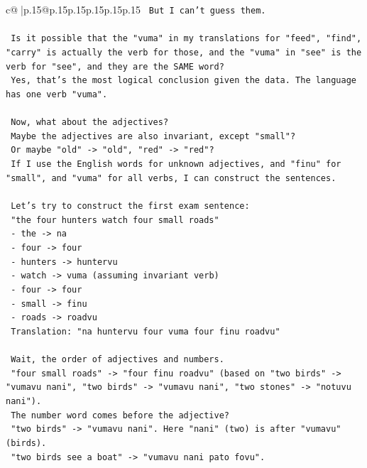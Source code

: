 \documentclass{article}
\begin{document}
{\begin{supertabular}{c@{$\;$}|p{.15\linewidth}@{}p{.15\linewidth}p{.15\linewidth}p{.15\linewidth}p{.15\linewidth}p{.15\linewidth}}
{{{\texttt{    But I can't guess them.} \\
\\ 
\texttt{    Is it possible that the "vuma" in my translations for "feed", "find", "carry" is actually the verb for those, and the "vuma" in "see" is the verb for "see", and they are the SAME word?} \\
\texttt{    Yes, that's the most logical conclusion given the data. The language has one verb "vuma".} \\
\\ 
\texttt{    Now, what about the adjectives?} \\
\texttt{    Maybe the adjectives are also invariant, except "small"?} \\
\texttt{    Or maybe "old" {-}> "old", "red" {-}> "red"?} \\
\texttt{    If I use the English words for unknown adjectives, and "finu" for "small", and "vuma" for all verbs, I can construct the sentences.} \\
\\ 
\texttt{    Let's try to construct the first exam sentence:} \\
\texttt{    "the four hunters watch four small roads"} \\
\texttt{    {-} the {-}> na} \\
\texttt{    {-} four {-}> four} \\
\texttt{    {-} hunters {-}> huntervu} \\
\texttt{    {-} watch {-}> vuma (assuming invariant verb)} \\
\texttt{    {-} four {-}> four} \\
\texttt{    {-} small {-}> finu} \\
\texttt{    {-} roads {-}> roadvu} \\
\texttt{    Translation: "na huntervu four vuma four finu roadvu"} \\
\\ 
\texttt{    Wait, the order of adjectives and numbers.} \\
\texttt{    "four small roads" {-}> "four finu roadvu" (based on "two birds" {-}> "vumavu nani", "two birds" {-}> "vumavu nani", "two stones" {-}> "notuvu nani").} \\
\texttt{    The number word comes before the adjective?} \\
\texttt{    "two birds" {-}> "vumavu nani". Here "nani" (two) is after "vumavu" (birds).} \\
\texttt{    "two birds see a boat" {-}> "vumavu nani pato fovu".} \\
}}}
\end{supertabular}}
\end{document}
